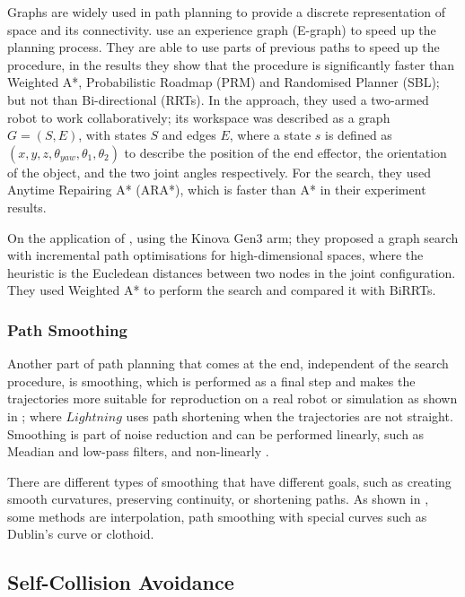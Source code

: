 \documentclass[thesis]{mas_proposal}
\begin{document}
    Graphs are widely used in path planning to provide a discrete representation of space and its connectivity. \cite{Phillips2012} use an experience graph (E-graph) to speed up the planning process. They are able to use parts of previous paths to speed up the procedure, in the results they show that the procedure is significantly faster than Weighted A*, Probabilistic Roadmap (PRM) and Randomised Planner (SBL); but not than Bi-directional (RRTs). In the \cite{Cohen2012} approach, they used a two-armed robot to work collaboratively; its workspace was described as a graph $G = (S, E)$, with states $S$ and edges $E$, where a state $s$ is defined as $(x, y, z, \theta_{yaw}, \theta_{1}, \theta_{2})$ to describe the position of the end effector, the orientation of the object, and the two joint angles respectively. For the search, they used Anytime Repairing A* (ARA*), which is faster than A* in their experiment results.
    
    On the application of \cite{Natarajan2023}, using the Kinova Gen3 arm; they proposed a graph search with incremental path optimisations for high-dimensional spaces, where the heuristic is the Eucledean distances between two nodes in the joint configuration. They used Weighted A* to perform the search and compared it with BiRRTs.
    
    \subsubsection{Path Smoothing}
    
    Another part of path planning that comes at the end, independent of the search procedure, is smoothing, which is performed as a final step and makes the trajectories more suitable for reproduction on a real robot or simulation as shown in \cite{Berenson2012, Coleman2015}; where $Lightning$ uses path shortening when the trajectories are not straight. Smoothing is part of noise reduction and can be performed linearly, such as Meadian and low-pass filters, and non-linearly \cite{Siegwart2011, Ravichandar2020, Si2021}.
    
    There are different types of smoothing that have different goals, such as creating smooth curvatures, preserving continuity, or shortening paths. As shown in \cite{Ravankar2018}, some methods are interpolation, path smoothing with special curves such as Dublin's curve or clothoid.
    
    \subsection{Self-Collision Avoidance}
    
\end{document}
